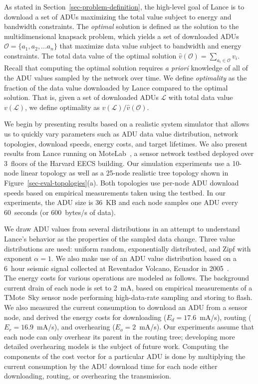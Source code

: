As stated in Section~\ref{sec-problem-definition}, the high-level goal of
Lance is to download a set of ADUs maximizing the total value subject to
energy and bandwidth constraints. The {\em optimal} solution is
defined as the solution to the multidimensional knapsack problem,
which yields a set of downloaded ADUs $\mathcal{O} = \{a_1, a_2, ...
a_n\}$ that maximize data value subject to bandwidth and energy
constraints. The total data value of the optimal solution 
$\hat{v}(\mathcal{O}) = \sum_{a_i \in \mathcal{O}} v_i$.
Recall that computing the optimal solution requires {\em a priori} 
knowledge of all of the ADU values sampled by the network over time.
We define {\em optimality} as the fraction of the data value 
downloaded by Lance compared to the optimal solution. That is, given
a set of downloaded ADUs $\mathcal{L}$ with total data value
$v(\mathcal{L})$, we define optimality as 
$v(\mathcal{L}) / \hat{v}(\mathcal{O})$.


We begin by presenting results based on a realistic system
simulator that allows us to quickly vary parameters such as 
ADU data value distribution, network topologies, download speeds,
energy costs, and target lifetimes. We also present results from 
Lance running on MoteLab~\cite{motelab}, a sensor network testbed
deployed over 3~floors of the Harvard EECS building.
Our simulation experiments use
a 10-node linear topology as well as a 25-node realistic tree topology
shown in Figure~\ref{sec-eval-topologies}(a). Both
topologies use per-node ADU download speeds based on empirical 
measurements taken using the testbed. 
In our experiments, the ADU size is 36~KB and each node samples one 
ADU every 60~seconds (or 600~bytes/s of data).

We draw ADU values from several distributions in an attempt to understand
Lance's behavior as the properties of the sampled data change.  Three value
distributions are used: uniform random, exponentially distributed, and Zipf
with exponent $\alpha = 1$.  We also make use of an ADU value distribution
based on a 6~hour seismic signal collected at Reventador Volcano, Ecuador in
2005~\cite{volcano-osdi06}.\\

The energy costs for various operations are modeled as follows.  The
background current drain of each node is set to 2~mA, based on empirical
measurements of a TMote~Sky sensor node performing high-data-rate sampling
and storing to flash.  We also measured the current consumption to download
an ADU from a sensor node, and derived the energy costs for downloading ($E_d
= 17.6$~mA/s), routing ($E_r = 16.9$~mA/s), and overhearing ($E_o = 2$~mA/s).
Our experiments assume that each node can only overhear its parent in the
routing tree; developing more detailed overhearing models is the subject of
future work.  Computing the components of the cost vector for a particular
ADU is done by multiplying the current consumption by the ADU download time
for each node either downloading, routing, or overhearing the transmission.

